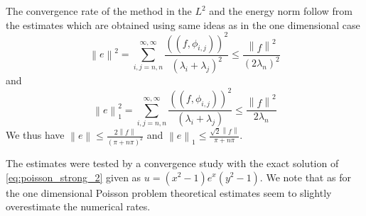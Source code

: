 \documentclass[a4paper,10pt]{article}
\newcommand{\norm}[1]{\ensuremath{\left\|#1\right\|}}
\newcommand{\Inner}[2]{\ensuremath{\left(\left(#1, #2\right)\right)}}
\begin{document}
  The convergence rate of the method in the $L^2$ and the energy norm follow
  from the estimates which are obtained using same ideas as in the one
  dimensional case
  \[
    \norm{e}^2 = \sum\limits_{i, j = n, n}^{\infty,
    \infty}\frac{\Inner{f}{\phi_{i, j}}^2}{\left(\lambda_i + \lambda_j\right)^2}
      \leq
      \frac{\norm{f}^2}{\left(2\lambda_n\right)^2}
  \]
  and
\[
    \norm{e}_1^2 = \sum\limits_{i, j = n, n}^{\infty,
    \infty}\frac{\Inner{f}{\phi_{i, j}}^2}{\left(\lambda_i + \lambda_j\right)}
      \leq
      \frac{\norm{f}^2}{2\lambda_n}
  \]
  We thus have $\norm{e}\leq\frac{2\norm{f}}{\left(\pi + n\pi\right)^2}$ and
  $\norm{e}_1\leq\frac{\sqrt{2}\norm{f}}{\pi + n\pi}$.

  The estimates were tested by a convergence study with the exact solution
  of \ref{eq:poisson_strong_2} given as $u=(x^2 - 1)e^x(y^2 - 1)$. We note that
  as for the one dimensional Poisson problem theoretical estimates seem to
  slightly overestimate the numerical rates.
\end{document}
